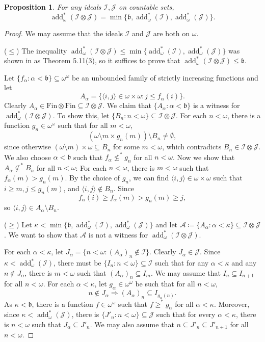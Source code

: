 \documentclass[a4paper,12pt]{amsart}
\newtheorem{prop}[thm]{Proposition}
\theoremstyle{definition}
\numberwithin{thm}{section}
\numberwithin{equation}{section}
\newcommand{\bb}{\mathfrak{b}}
\DeclareMathOperator{\add}{add}
\newcommand{\I}{\mathscr{I}}
\newcommand{\J}{\mathscr{J}}
\newcommand{\finfin}{\mathrm{Fin}\otimes\mathrm{Fin}}
\renewcommand{\subset}{\subseteq}
\newcommand{\baire}{\omega^\omega}
\begin{document}
	\begin{prop}\label{prop:addstart_omega_of_Fubini_prod}
	   	For any ideals $\I, \J$ on countable sets,
	 	\[
	  	\add^*_\omega(\I\otimes\J) = \min\{\bb, \add^*_\omega(\I), \add^*_\omega(\J)\}.
	   	\]
	\end{prop}
	\begin{proof}
        We may assume that the ideals $\I$ and $\J$ are both on $\omega$.
        
		($\leq$) The inequality $\add^*_\omega(\I\otimes\J) \leq \min \{ \add^*_\omega(\I), \add^*_\omega(\J)\}$ was shown in \cite{FK25} as Theorem 5.11(3), so it suffices to prove that $\add^*_\omega(\I\otimes\J) \leq \bb$.
            
        Let $\{f_\alpha : \alpha < \bb\} \subseteq \baire$ be an unbounded family of strictly increasing functions and let
        \[
        A_\alpha = \{ \langle i,j \rangle\in\omega\times\omega : j \leq f_\alpha(i)\}.
        \]
        Clearly $A_\alpha \in \finfin \subset \I\otimes\J$. We claim that $\{A_\alpha : \alpha<\bb\}$ is a witness for $\add^*_\omega(\I\otimes\J)$. To show this, let $\{B_n: n<\omega\} \subseteq \I\otimes\J$. For each $n<\omega$, there is a function $g_n\in\omega^\omega$ such that for all $m<\omega$,
        \[
        (\omega \setminus m \times g_n(m))\setminus B_n \neq\emptyset,
        \]
        since otherwise $(\omega\setminus m)\times\omega\subset B_n$ for some $m<\omega$, which contradicts $B_n\in\I\otimes\J$. We also choose $\alpha<\bb$ such that $f_\alpha \not\leq^* g_n$ for all $n<\omega$. Now we show that $A_\alpha\not\subset^* B_n$ for all $n<\omega$: For each $n<\omega$, there is $m<\omega$ such that $f_\alpha(m) > g_n(m)$. By the choice of $g_n$, we can find $\langle i, j \rangle \in \omega\times\omega$ such that $i\geq m, j\leq g_n(m)$, and $\langle i, j\rangle\notin B_n$. Since
        \[
        f_\alpha(i) \geq f_\alpha(m) > g_n(m) \geq j,
        \]
        so $\langle i, j\rangle \in A_\alpha \setminus B_n$.
			
		($\geq$) Let $\kappa < \min\{\bb, \add^*_\omega(\I), \add^*_\omega(\J)\}$ and let $\mathcal{A}\coloneqq\{A_\alpha : \alpha<\kappa\} \subseteq \I\otimes\J$. We want to show that $\mathcal{A}$ is not a witness for $\add^*_\omega(\I\otimes\J)$.
        
        For each $\alpha<\kappa$, let $J_\alpha = \{n<\omega : (A_\alpha)_n \notin \I\}$. Clearly $J_\alpha \in \J$. Since $\kappa<\add^*_\omega(\I)$, there must be $\{I_n: n< \omega\}\subset\I$ such that for any $\alpha<\kappa$ and any $n \notin J_\alpha$, there is $m<\omega$ such that $(A_\alpha)_n \subseteq I_m$. We may assume that $I_n\subset I_{n+1}$ for all $n<\omega$. For each $\alpha<\kappa$, let $g_\alpha\in\omega^\omega$ be such that for all $n<\omega$,
        \[
        n\notin J_\alpha \Rightarrow (A_\alpha)_n \subseteq I_{g_\alpha(n)}.
        \]
        As $\kappa < \bb$, there is a function $f\in\omega^\omega$ such that $f \geq^* g_\alpha$ for all $\alpha<\kappa$. Moreover, since $\kappa < \add^*_\omega(\J)$, there is $\{J'_n :n<\omega\}\subset\J$ such that for every $\alpha < \kappa$, there is $n<\omega$ such that $J_\alpha \subseteq J'_n$. We may also assume that $n\subset J'_n\subset J'_{n+1}$ for all $n<\omega$.
        

\end{proof}
\end{document}

